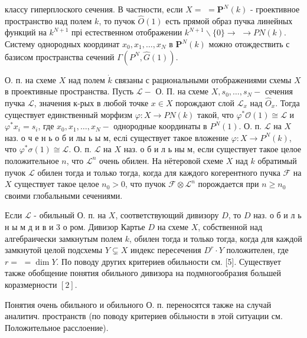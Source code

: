 \documentclass[10pt]{article}
\begin{document}
классу гиперплоского сечения. В частности, если $X=$ $=\boldsymbol{P}^{N}(k)$ - гроективное пространство над полем $k$, то пучок $\widehat{O}(1)$ есть прямой образ пучка линейных функций на $k^{N+1}$ прі естественном отображении $k^{N+1} \backslash\{0\} \rightarrow$ $\rightarrow P N(k)$. Систему однородных координат $x_{0}, x_{1}, \ldots, x_{N}$ в $\boldsymbol{P}^{N}(k)$ можно отождествить с базисом пространства сечений $\Gamma\left(P^{N}, \widehat{G}(1)\right)$.



О. п. на схеме $X$ над полем $\dot{k}$ связаны с рациональными отображениями схемы $X$ в проективные пространства. Пусть $\mathscr{L}-$ О. П. на схеме $X, s_{0}, \ldots, s_{N}-$ сечения пучка $\mathscr{L}$, значения к-рых в любой точке $x \in X$ порождают слой $\mathscr{L}_{x}$ над $\widehat{O}_{x}$. Тогда существует единственный морфизм $\varphi: X \rightarrow P N(k)$ такой, что $\varphi^{*} \mathcal{O}(1) \cong \mathscr{L}$ и $\varphi^{*} x_{i}=s_{i}$, где $x_{0}, x_{1}, \ldots, x_{N}-$ однородные координаты в $P^{N}(1)$. О. п. $\mathscr{L}$ на $X$ наз. о ч е н ь о б и лы ь ы м, еслі существует такое вложение $\varphi: X \rightarrow P^{N}(k)$, что $\varphi^{*} \sigma(1) \cong \mathscr{L}$. О. п. $\mathscr{L}$ на $X$ наз. о б и л ь ны м, если существует такое целое положительное $n$, что $\mathscr{L}^{n}$ очень обилен. На нётеровой схеме $X$ над $k$ обратимый пучок $\mathscr{L}$ обилен тогда и только тогда, когда для каждого когерентного пучка $\mathscr{F}$ на $X$ существует такое целое $n_{0}>0$, что пучок $\mathscr{F} \otimes \mathscr{L}^{n}$ порождается при $n \geqslant n_{0}$ своими глобальными сечениями.



Если $\mathscr{L}$ - обильный О. п. на $X$, соответствующий дивизору $D$, то $D$ наз. о б и л ь н ы м д и в и 3 о ром. Дивизор Картье $D$ на схеме $X$, собственной над алгебраически замкнутым полем $k$, обилен тогда и только тогда, когда для каждой замкнутой целой подсхемы $Y \subsetneq X$ индекс пересечения $D^{r} \cdot Y$ положителен, где $r=$ $=\operatorname{dim} Y$. По поводу других критериев обильности см. [5]. Существует также обобщение понятия обильного дивизора на подмногообразия большей коразмерности $[2]$.



Понятия очень обильного и обильного О. п. переносятся также на случай аналитич. пространств (по поводу критериев обільности в этой ситуации см. Положительное расслоение).
\end{document}
